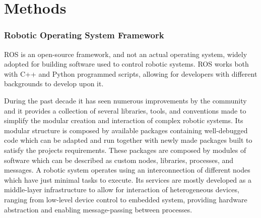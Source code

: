 \chapter{Methods}
\label{ch:whatYouDid}




\subsection{Robotic Operating System Framework}
\label{ssec:ros}
\noindent \Gls{ROS}\cite{288} is an open-source framework, and not an actual operating system, widely adopted for building software used to control robotic systems.
\Gls{ROS} works both with C++ and Python programmed scripts, allowing for developers with different backgrounds to develop upon it.

During the past decade it has seen numerous improvements by the community and it provides a collection of several libraries, tools, and conventions made to simplify the modular creation and interaction of complex robotic systems.
Its modular structure is composed by available packages containing well-debugged code which can be adapted and run together with newly made packages built to satisfy the projects requirements.
These packages are composed by modules of software which can be described as custom nodes, libraries, processes, and messages.
A robotic system operates using an interconnection of different nodes which have just minimal tasks to execute.
Its services are mostly developed as a middle-layer infrastructure to allow for interaction of heterogeneous devices, ranging from low-level device control to embedded system, providing hardware abstraction and enabling message-passing between processes.

